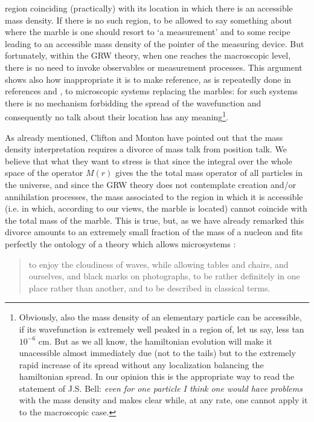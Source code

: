 \documentclass[10pt,a4paper]{article}
\begin{document}
\begin{enumerate}
region coinciding (practically) with its location in which there
is an accessible mass density. If there is no such region, to be
allowed to say something about where the marble is one should
resort to `a measurement' and to some recipe leading to an
accessible mass density of the pointer of the measuring device.
But fortunately, within the GRW theory, when one reaches the
macroscopic level, there is no need to  invoke  observables or
measurement processes. This argument shows also how inappropriate
it is to make reference, as is repeatedly done in references
\cite{cli1} and \cite{cli2}, to microscopic systems replacing the
marbles: for such systems there is no mechanism forbidding the
spread of the wavefunction and consequently no talk about their
location has any meaning\footnote{Obviously, also the mass density
of an elementary particle can be accessible, if its wavefunction
is extremely well peaked in a region of, let us say, less tan
$10^{-6}$ cm. But as we all know, the hamiltonian evolution will
make it unacessible almost immediately due (not to the tails) but
to the extremely rapid increase of its spread without any
localization balancing  the hamiltonian spread. In our opinion this is
the appropriate way to read the statement of J.S. Bell: {\it
even for one particle I think one would have problems }with the mass
density and makes clear while, at any rate, one cannot  apply it to the
macroscopic case.}.
\end{enumerate}

As already mentioned, Clifton and Monton have pointed out that the
mass density interpretation requires a divorce of mass talk from
position talk.  We believe that what they want to stress is that
since the integral over the whole space of the operator $M(r)$
gives the the total mass operator of all particles in the
universe, and since the GRW theory does not contemplate creation
and/or annihilation processes, the mass associated to the region
in which it is accessible (i.e. in which, according to our views,
the marble is located) cannot coincide with the total mass of the
marble. This is true, but, as we have already remarked this
divorce amounts to an extremely small fraction of the mass of a
nucleon and fits perfectly the ontology of a theory which allows
microsystems \cite{bellns}:
\begin{quotation}
to enjoy the cloudiness of waves, while allowing tables and
chairs, and ourselves, and black marks on photographs, to be
rather definitely in one place rather than another, and to be
described in classical terms.
\end{quotation}
\end{document}
